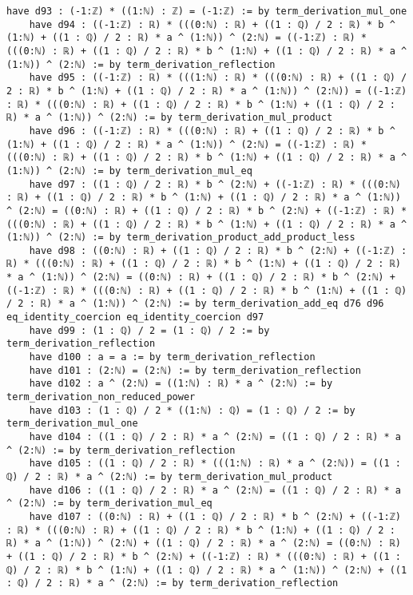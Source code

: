 \documentclass{article}
\begin{document}
\begin{tcolorbox}[colback=white!10, width=\linewidth]
\begin{lstlisting}[language=Lean4]
    have d93 : (-1:ℤ) * ((1:ℕ) : ℤ) = (-1:ℤ) := by term_derivation_mul_one
    have d94 : ((-1:ℤ) : ℝ) * (((0:ℕ) : ℝ) + ((1 : ℚ) / 2 : ℝ) * b ^ (1:ℕ) + ((1 : ℚ) / 2 : ℝ) * a ^ (1:ℕ)) ^ (2:ℕ) = ((-1:ℤ) : ℝ) * (((0:ℕ) : ℝ) + ((1 : ℚ) / 2 : ℝ) * b ^ (1:ℕ) + ((1 : ℚ) / 2 : ℝ) * a ^ (1:ℕ)) ^ (2:ℕ) := by term_derivation_reflection
    have d95 : ((-1:ℤ) : ℝ) * (((1:ℕ) : ℝ) * (((0:ℕ) : ℝ) + ((1 : ℚ) / 2 : ℝ) * b ^ (1:ℕ) + ((1 : ℚ) / 2 : ℝ) * a ^ (1:ℕ)) ^ (2:ℕ)) = ((-1:ℤ) : ℝ) * (((0:ℕ) : ℝ) + ((1 : ℚ) / 2 : ℝ) * b ^ (1:ℕ) + ((1 : ℚ) / 2 : ℝ) * a ^ (1:ℕ)) ^ (2:ℕ) := by term_derivation_mul_product
    have d96 : ((-1:ℤ) : ℝ) * (((0:ℕ) : ℝ) + ((1 : ℚ) / 2 : ℝ) * b ^ (1:ℕ) + ((1 : ℚ) / 2 : ℝ) * a ^ (1:ℕ)) ^ (2:ℕ) = ((-1:ℤ) : ℝ) * (((0:ℕ) : ℝ) + ((1 : ℚ) / 2 : ℝ) * b ^ (1:ℕ) + ((1 : ℚ) / 2 : ℝ) * a ^ (1:ℕ)) ^ (2:ℕ) := by term_derivation_mul_eq
    have d97 : ((1 : ℚ) / 2 : ℝ) * b ^ (2:ℕ) + ((-1:ℤ) : ℝ) * (((0:ℕ) : ℝ) + ((1 : ℚ) / 2 : ℝ) * b ^ (1:ℕ) + ((1 : ℚ) / 2 : ℝ) * a ^ (1:ℕ)) ^ (2:ℕ) = ((0:ℕ) : ℝ) + ((1 : ℚ) / 2 : ℝ) * b ^ (2:ℕ) + ((-1:ℤ) : ℝ) * (((0:ℕ) : ℝ) + ((1 : ℚ) / 2 : ℝ) * b ^ (1:ℕ) + ((1 : ℚ) / 2 : ℝ) * a ^ (1:ℕ)) ^ (2:ℕ) := by term_derivation_product_add_product_less
    have d98 : ((0:ℕ) : ℝ) + ((1 : ℚ) / 2 : ℝ) * b ^ (2:ℕ) + ((-1:ℤ) : ℝ) * (((0:ℕ) : ℝ) + ((1 : ℚ) / 2 : ℝ) * b ^ (1:ℕ) + ((1 : ℚ) / 2 : ℝ) * a ^ (1:ℕ)) ^ (2:ℕ) = ((0:ℕ) : ℝ) + ((1 : ℚ) / 2 : ℝ) * b ^ (2:ℕ) + ((-1:ℤ) : ℝ) * (((0:ℕ) : ℝ) + ((1 : ℚ) / 2 : ℝ) * b ^ (1:ℕ) + ((1 : ℚ) / 2 : ℝ) * a ^ (1:ℕ)) ^ (2:ℕ) := by term_derivation_add_eq d76 d96 eq_identity_coercion eq_identity_coercion d97
    have d99 : (1 : ℚ) / 2 = (1 : ℚ) / 2 := by term_derivation_reflection
    have d100 : a = a := by term_derivation_reflection
    have d101 : (2:ℕ) = (2:ℕ) := by term_derivation_reflection
    have d102 : a ^ (2:ℕ) = ((1:ℕ) : ℝ) * a ^ (2:ℕ) := by term_derivation_non_reduced_power
    have d103 : (1 : ℚ) / 2 * ((1:ℕ) : ℚ) = (1 : ℚ) / 2 := by term_derivation_mul_one
    have d104 : ((1 : ℚ) / 2 : ℝ) * a ^ (2:ℕ) = ((1 : ℚ) / 2 : ℝ) * a ^ (2:ℕ) := by term_derivation_reflection
    have d105 : ((1 : ℚ) / 2 : ℝ) * (((1:ℕ) : ℝ) * a ^ (2:ℕ)) = ((1 : ℚ) / 2 : ℝ) * a ^ (2:ℕ) := by term_derivation_mul_product
    have d106 : ((1 : ℚ) / 2 : ℝ) * a ^ (2:ℕ) = ((1 : ℚ) / 2 : ℝ) * a ^ (2:ℕ) := by term_derivation_mul_eq
    have d107 : ((0:ℕ) : ℝ) + ((1 : ℚ) / 2 : ℝ) * b ^ (2:ℕ) + ((-1:ℤ) : ℝ) * (((0:ℕ) : ℝ) + ((1 : ℚ) / 2 : ℝ) * b ^ (1:ℕ) + ((1 : ℚ) / 2 : ℝ) * a ^ (1:ℕ)) ^ (2:ℕ) + ((1 : ℚ) / 2 : ℝ) * a ^ (2:ℕ) = ((0:ℕ) : ℝ) + ((1 : ℚ) / 2 : ℝ) * b ^ (2:ℕ) + ((-1:ℤ) : ℝ) * (((0:ℕ) : ℝ) + ((1 : ℚ) / 2 : ℝ) * b ^ (1:ℕ) + ((1 : ℚ) / 2 : ℝ) * a ^ (1:ℕ)) ^ (2:ℕ) + ((1 : ℚ) / 2 : ℝ) * a ^ (2:ℕ) := by term_derivation_reflection

\end{lstlisting}
\end{tcolorbox}
\end{document}
